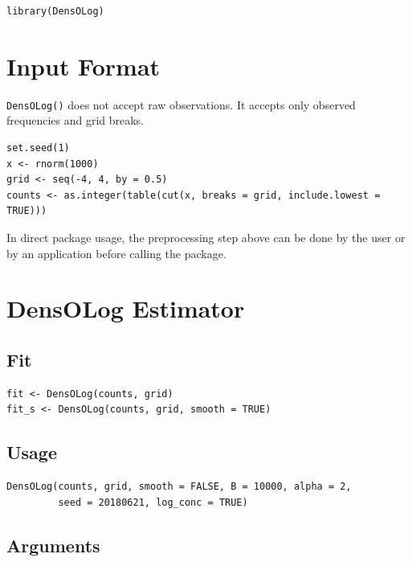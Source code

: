 \documentclass[11pt]{article}
\begin{document}
\begin{lstlisting}
library(DensOLog)
\end{lstlisting}

\section{Input Format}

\texttt{DensOLog()} does not accept raw observations. It accepts only observed
frequencies and grid breaks.

\begin{lstlisting}
set.seed(1)
x <- rnorm(1000)
grid <- seq(-4, 4, by = 0.5)
counts <- as.integer(table(cut(x, breaks = grid, include.lowest = TRUE)))
\end{lstlisting}

In direct package usage, the preprocessing step above can be done by the user
or by an application before calling the package.

\section{DensOLog Estimator}

\subsection{Fit}

\begin{lstlisting}
fit <- DensOLog(counts, grid)
fit_s <- DensOLog(counts, grid, smooth = TRUE)
\end{lstlisting}

\subsection*{Usage}

\begin{lstlisting}
DensOLog(counts, grid, smooth = FALSE, B = 10000, alpha = 2,
         seed = 20180621, log_conc = TRUE)
\end{lstlisting}

\subsection*{Arguments}
\end{document}
